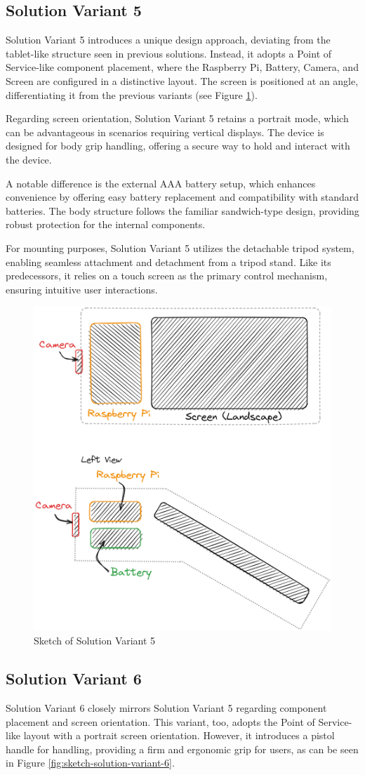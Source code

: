 \subsection{Solution Variant 5}
Solution Variant 5 introduces a unique design approach, deviating from the tablet-like structure seen in previous solutions. Instead, it adopts a Point of Service-like component placement, where the Raspberry Pi, Battery, Camera, and Screen are configured in a distinctive layout. The screen is positioned at an angle, differentiating it from the previous variants (see Figure \ref{fig:sketch-solution-variant-5}).

Regarding screen orientation, Solution Variant 5 retains a portrait mode, which can be advantageous in scenarios requiring vertical displays. The device is designed for body grip handling, offering a secure way to hold and interact with the device.

A notable difference is the external AAA battery setup, which enhances convenience by offering easy battery replacement and compatibility with standard batteries. The body structure follows the familiar sandwich-type design, providing robust protection for the internal components.

For mounting purposes, Solution Variant 5 utilizes the detachable tripod system, enabling seamless attachment and detachment from a tripod stand. Like its predecessors, it relies on a touch screen as the primary control mechanism, ensuring intuitive user interactions.

\begin{figure}[H]
    \centering
    \includegraphics[width=0.5\linewidth]{texs/Part1/chapter3/image/v5.png}
    \caption{Sketch of Solution Variant 5}
    \label{fig:sketch-solution-variant-5}
\end{figure}

\subsection{Solution Variant 6}
Solution Variant 6 closely mirrors Solution Variant 5 regarding component placement and screen orientation. This variant, too, adopts the Point of Service-like layout with a portrait screen orientation. However, it introduces a pistol handle for handling, providing a firm and ergonomic grip for users, as can be seen in Figure \ref{fig:sketch-solution-variant-6}.

